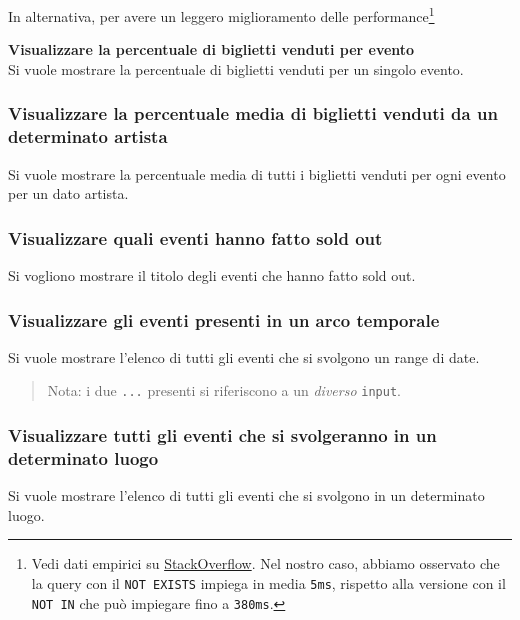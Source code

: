 \documentclass[a4paper,11pt]{article}
\begin{document}
In alternativa, per avere un leggero miglioramento delle performance\footnote{
Vedi dati empirici su \href{https://stackoverflow.com/a/66785790}{StackOverflow}.
Nel nostro caso, abbiamo osservato che la query con il \texttt{NOT EXISTS}
impiega in media \texttt{5ms}, rispetto alla versione con il \texttt{NOT IN}
che pu\`o impiegare fino a \texttt{380ms}.}


\textbf{Visualizzare la percentuale di biglietti venduti per evento}\\
Si vuole mostrare la percentuale di biglietti venduti per un singolo evento.


\subsubsection{Visualizzare la percentuale media di biglietti venduti da un determinato artista}
Si vuole mostrare la percentuale media di tutti i biglietti venduti per ogni
evento per un dato artista.


\subsubsection{Visualizzare quali eventi hanno fatto sold out}
Si vogliono mostrare il titolo degli eventi che hanno fatto sold out.

 
\subsubsection{Visualizzare gli eventi presenti in un arco temporale}
Si vuole mostrare l'elenco di tutti gli eventi che si svolgono un range di date.


\begin{quote}
  Nota: i due \texttt{...} presenti si riferiscono a un \emph{diverso} \texttt{input}.
\end{quote}

\subsubsection{Visualizzare tutti gli eventi che si svolgeranno in un determinato luogo}
Si vuole mostrare l'elenco di tutti gli eventi che si svolgono in un determinato luogo.

\end{document}
